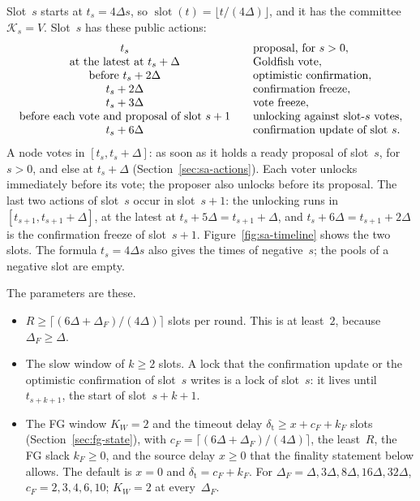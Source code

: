 \documentclass{article}
\newcommand{\slot}{\operatorname{slot}}
\newcommand{\committee}{\mathcal K}
\begin{document}
Slot~$s$ starts at $t_s=4\Delta s$, so $\slot(t)=\lfloor t/(4\Delta)\rfloor$,
and it has the committee $\committee_s=V$.  Slot~$s$ has these public
actions:
\[
\begin{array}{c@{\qquad}l}
 t_s             & \text{proposal, for $s>0$},\\
 \text{at the latest at }t_s+\Delta & \text{Goldfish vote},\\
 \text{before }t_s+2\Delta & \text{optimistic confirmation},\\
 t_s+2\Delta     & \text{confirmation freeze},\\
 t_s+3\Delta     & \text{vote freeze},\\
 \text{before each vote and proposal of slot $s+1$} & \text{unlocking against slot-$s$ votes},\\
 t_s+6\Delta     & \text{confirmation update of slot $s$}.
\end{array}
\]
A node votes in $[t_s,t_s+\Delta]$: as soon as it holds a ready proposal
of slot~$s$, for $s>0$, and else at
$t_s+\Delta$ (Section~\ref{sec:sa-actions}).  Each voter unlocks
immediately before its vote; the proposer also unlocks before its
proposal.  The last two actions of slot~$s$ occur in
slot~$s+1$: the unlocking runs in $[t_{s+1},t_{s+1}+\Delta]$, at the latest
at $t_s+5\Delta=t_{s+1}+\Delta$, and $t_s+6\Delta=t_{s+1}+2\Delta$ is the
confirmation freeze of slot~$s+1$.
Figure~\ref{fig:sa-timeline} shows the two slots.  The formula
$t_s=4\Delta s$ also gives the times of negative~$s$; the pools of a
negative slot are empty.

The parameters are these.
\begin{itemize}
\item $R\geq\lceil(6\Delta+\Delta_F)/(4\Delta)\rceil$ slots per round.  This
  is at least~$2$, because $\Delta_F\geq\Delta$.
\item The slow window of $k\geq2$ slots.  A lock that the confirmation
  update or the optimistic confirmation of slot~$s$ writes is a lock of
  slot~$s$: it lives until $t_{s+k+1}$, the start of slot~$s+k+1$.
\item The FG window $K_W=2$ and the timeout delay
  $\delta_{\mathrm{t}}\geq x+c_F+k_F$ slots (Section~\ref{sec:fg-state}),
  with $c_F=\lceil(6\Delta+\Delta_F)/(4\Delta)\rceil$, the least~$R$, the
  FG slack $k_F\geq0$, and the source delay $x\geq0$ that the finality
  statement below allows.  The default is $x=0$ and
  $\delta_{\mathrm{t}}=c_F+k_F$.  For
  $\Delta_F=\Delta,3\Delta,8\Delta,16\Delta,32\Delta$, $c_F=2,3,4,6,10$;
  $K_W=2$ at every~$\Delta_F$.
\end{itemize}
\end{document}
